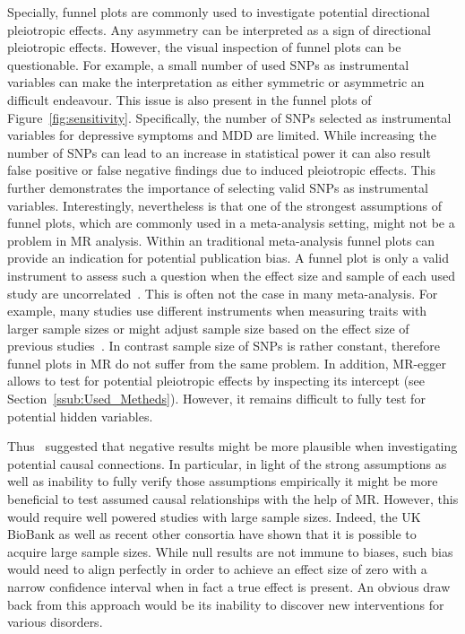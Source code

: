 Specially, funnel plots are commonly used to investigate potential directional pleiotropic effects.
Any asymmetry can be interpreted as a sign of directional pleiotropic effects.
However, the visual inspection of funnel plots can be questionable.
For example, a small number of used SNPs as instrumental variables can make the interpretation as either symmetric or asymmetric an difficult endeavour. 
This issue is also present in the funnel plots of Figure~\ref{fig:sensitivity}.
Specifically, the number of SNPs selected as instrumental variables for depressive symptoms and MDD are limited. 
While increasing the number of SNPs can lead to an increase in statistical power it can also result false positive or false negative findings due to induced pleiotropic effects.
This further demonstrates the importance of selecting valid SNPs as instrumental variables.
Interestingly, nevertheless is that one of the strongest assumptions of funnel plots, which are commonly used in a meta-analysis setting, might not be a problem in MR analysis.
Within an traditional meta-analysis funnel plots can provide an indication for potential publication bias.
A funnel plot is only a valid instrument to assess such a question when the effect size and sample of each used study are uncorrelated~\cite{Evans2013}.
This is often not the case in many meta-analysis.
For example, many studies use different instruments when measuring traits with larger sample sizes or might adjust sample size based on the effect size of previous studies~\cite{Simonsohn}.
In contrast sample size of SNPs is rather constant, therefore funnel plots in MR do not suffer from the same problem.
In addition, MR-egger allows to test for potential pleiotropic effects by inspecting its intercept (see Section~\ref{ssub:Used_Metheds}).
However, it remains difficult to fully test for potential hidden variables. 

Thus~\citet{Vanderweele2015} suggested that negative results might be more plausible when investigating potential causal connections.
In particular, in light of the strong assumptions as well as inability to fully verify those assumptions empirically it might be more beneficial to test assumed causal relationships with the help of MR\@.
However, this would require well powered studies with large sample sizes.
Indeed, the UK BioBank as well as recent other consortia have shown that it is possible to acquire large sample sizes.
While null results are not immune to biases, such bias would need to align perfectly in order to achieve an effect size of zero with a narrow confidence interval when in fact a true effect is present.
An obvious draw back from this approach would be its inability to discover new interventions for various disorders. 

